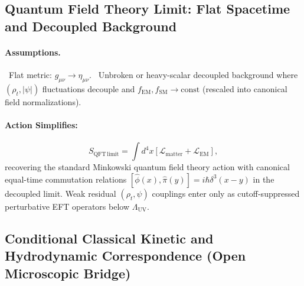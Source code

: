 \subsection{Quantum Field Theory Limit: Flat Spacetime and Decoupled Background}
\label{app:QFTlimit}

\paragraph{Assumptions.}
\noindent\textbullet~Flat metric: $g_{\mu\nu} \to \eta_{\mu\nu}$.
\noindent\textbullet~Unbroken or heavy-scalar decoupled background where $(\rho_t, |\psi|)$ fluctuations decouple and $f_{\mathrm{EM}}, f_{\mathrm{SM}} \to \text{const}$ (rescaled into canonical field normalizations).

\paragraph{Action Simplifies:}
\[
S_{\mathrm{QFT\,limit}} = \int d^4x \left[
    \mathcal{L}_{\text{matter}} + \mathcal{L}_{\text{EM}}
\right],
\]
recovering the standard Minkowski quantum field theory action with canonical equal-time commutation relations $[\hat{\phi}(x), \hat{\pi}(y)] = i \hbar \delta^3(x - y)$ in the decoupled limit. Weak residual $(\rho_t, \psi)$ couplings enter only as cutoff-suppressed perturbative EFT operators below $\Lambda_{\mathrm{UV}}$.

\subsection{Conditional Classical Kinetic and Hydrodynamic Correspondence (Open Microscopic Bridge)}
\label{app:KineticLimit}

